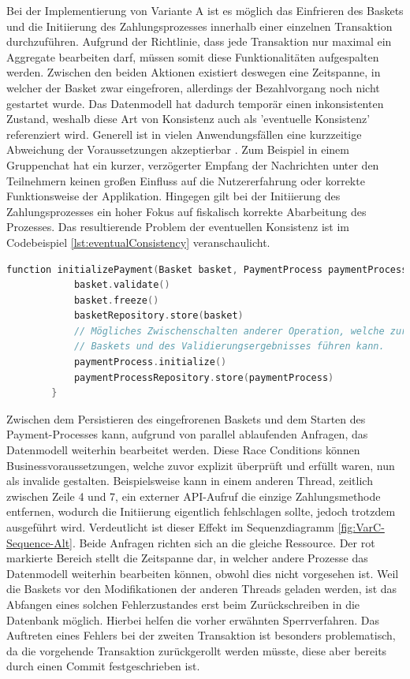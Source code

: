 Bei der Implementierung von Variante A ist es möglich das Einfrieren des Baskets und die Initiierung des Zahlungsprozesses innerhalb einer einzelnen Transaktion durchzuführen. Aufgrund der Richtlinie, dass jede Transaktion nur maximal ein Aggregate bearbeiten darf, müssen somit diese Funktionalitäten aufgespalten werden. Zwischen den beiden Aktionen existiert deswegen eine Zeitspanne, in welcher der Basket zwar eingefroren, allerdings der Bezahlvorgang noch nicht gestartet wurde. Das Datenmodell hat dadurch temporär einen inkonsistenten Zustand, weshalb diese Art von Konsistenz auch als 'eventuelle Konsistenz' referenziert wird. Generell ist in vielen Anwendungsfällen eine kurzzeitige Abweichung der Voraussetzungen akzeptierbar \cite[S. 364f.]{Vernon.2011}. Zum Beispiel in einem Gruppenchat hat ein kurzer, verzögerter Empfang der Nachrichten unter den Teilnehmern keinen großen Einfluss auf die Nutzererfahrung oder korrekte Funktionsweise der Applikation. Hingegen gilt bei der Initiierung des Zahlungsprozesses ein hoher Fokus auf fiskalisch korrekte Abarbeitung des Prozesses. Das resultierende Problem der eventuellen Konsistenz ist im Codebeispiel \ref{lst:eventualConsistency} veranschaulicht.

\begin{minipage}{\linewidth} %
	\begin{lstlisting}[caption={Getrennte Transaktionen für die Initiierung des Bezahlvorgangs}, label={lst:eventualConsistency}, language=Kotlin]
		function initializePayment(Basket basket, PaymentProcess paymentProcess) {
			basket.validate()
			basket.freeze()
			basketRepository.store(basket)
			// Mögliches Zwischenschalten anderer Operation, welche zur Abänderung des
			// Baskets und des Validierungsergebnisses führen kann.
			paymentProcess.initialize()
			paymentProcessRepository.store(paymentProcess)
		}
	\end{lstlisting}
\end{minipage}

Zwischen dem Persistieren des eingefrorenen Baskets und dem Starten des Payment-Processes kann, aufgrund von parallel ablaufenden Anfragen, das Datenmodell weiterhin bearbeitet werden. Diese \Gls{Race Condition}s können Businessvoraussetzungen, welche zuvor explizit überprüft und erfüllt waren, nun als invalide gestalten. Beispielsweise kann in einem anderen Thread, zeitlich zwischen Zeile 4 und 7, ein externer API-Aufruf die einzige Zahlungsmethode entfernen, wodurch die Initiierung eigentlich fehlschlagen sollte, jedoch trotzdem ausgeführt wird. Verdeutlicht ist dieser Effekt im Sequenzdiagramm \ref{fig:VarC-Sequence-Alt}. Beide Anfragen richten sich an die gleiche Ressource. Der rot markierte Bereich stellt die Zeitspanne dar, in welcher andere Prozesse das Datenmodell weiterhin bearbeiten können, obwohl dies nicht vorgesehen ist. Weil die Baskets vor den Modifikationen der anderen Threads geladen werden, ist das Abfangen eines solchen Fehlerzustandes erst beim Zurückschreiben in die Datenbank möglich. Hierbei helfen die vorher erwähnten Sperrverfahren. Das Auftreten eines Fehlers bei der zweiten Transaktion ist besonders problematisch, da die vorgehende Transaktion zurückgerollt werden müsste, diese aber bereits durch einen Commit festgeschrieben ist. 

